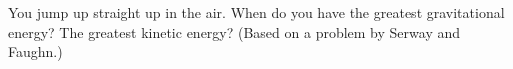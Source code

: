 You jump up straight up in the air. When do you have the greatest
gravitational energy? The greatest kinetic energy?
(Based on a problem by Serway and Faughn.)
